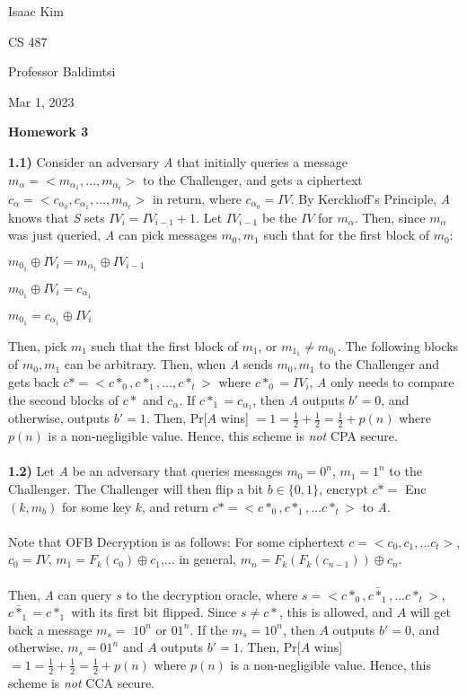 \documentclass[12pt]{article}
\begin{document}
\noindent Isaac Kim

\noindent CS 487

\noindent Professor Baldimtsi

\noindent Mar 1, 2023

\begin{center} 
\textbf{Homework 3}
\end{center}

\noindent \textbf{1.1)} Consider an adversary \emph{A} that initially queries a message $m_\alpha = <m_{\alpha_1},...,m_{\alpha_t}>$ to the Challenger, and gets a ciphertext $c_\alpha = <c_{\alpha_0},c_{\alpha_1},...,m_{\alpha_t}>$ in return, where $c_{\alpha_0} = IV$. By Kerckhoff's Principle, \emph{A} knows that \emph{S} sets $IV_i = IV_{i-1} + 1$. Let $IV_{i-1}$ be the $IV$ for $m_\alpha$. Then, since $m_\alpha$ was just queried, \emph{A} can pick messages $m_0, m_1$ such that for the first block of $m_0$:
\begin{center}
$m_{0_1} \oplus IV_i = m_{\alpha_1} \oplus IV_{i-1}$

$m_{0_1} \oplus IV_i = c_{\alpha_1}$

$m_{0_1} = c_{\alpha_1} \oplus IV_i$
\end{center}
Then, pick $m_1$ such that the first block of $m_1$, or $m_{1_1} \neq m_{0_1}$. The following blocks of $m_0, m_1$ can be arbitrary. Then, when \emph{A} sends $m_0, m_1$ to the Challenger and gets back $c*=<c*_0,c*_1,...,c*_t>$ where $c*_0=IV_i$, \emph{A} only needs to compare the second blocks of $c*$ and $c_\alpha$. If $c*_1 = c_{\alpha_1}$, then \emph{A} outputs $b' = 0$, and otherwise, outputs $b' = 1$. Then, Pr[$A$ wins] $= 1 = \frac{1}{2} + \frac{1}{2} =\frac{1}{2} + p(n)$ where $p(n)$ is a non-negligible value. Hence, this scheme is \emph{not} CPA secure.
\\
\\
\noindent \textbf{1.2)} Let \emph{A} be an adversary that queries messages $m_0 = 0^n$, $m_1=1^n$ to the Challenger. The Challenger will then flip a bit $b \in \{0,1\}$, encrypt $c* =$ Enc$(k, m_b)$ for some key $k$, and return $c* = <c*_0, c*_1,...c*_t>$ to \emph{A}. 
\\
\\
\noindent Note that OFB Decryption is as follows: For some ciphertext $c = <c_0, c_1,...c_t>$, $c_0 = IV$, $m_1 = F_k(c_0)\oplus c_1$,... in general, $m_n = F_k(F_k(c_{n-1})) \oplus c_n$. 
\\
\\
\noindent Then, \emph{A} can query $s$ to the decryption oracle, where $s = <c*_0, \bar{c*_1},...c*_t>$, $\bar{c*_1} = c*_1$ with its first bit flipped.
Since $s \neq c*$, this is allowed, and $A$ will get back a message $m_s=$ $10^n$ or $01^n$. If the $m_s = 10^n$, then $A$ outputs $b'=0$, and otherwise, $m_s = 01^n$ and $A$ outputs $b' = 1$. Then, Pr[$A$ wins] $= 1 = \frac{1}{2} + \frac{1}{2} =\frac{1}{2} + p(n)$ where $p(n)$ is a non-negligible value. Hence, this scheme is \emph{not} CCA secure.
\\
\\
\end{document}
